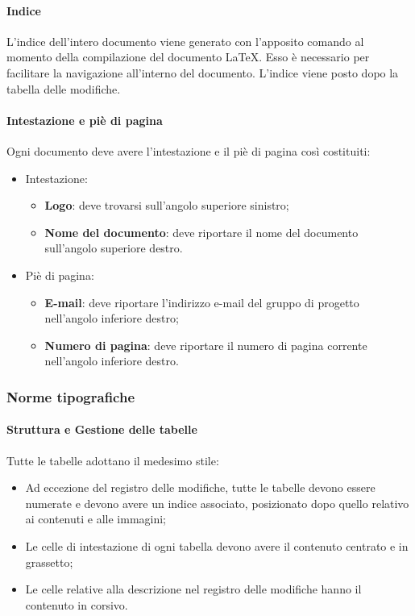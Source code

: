   \paragraph{Indice}
  L'indice dell'intero documento viene generato con l'apposito comando al momento della compilazione
  del documento \LaTeX. Esso è necessario per facilitare la navigazione all'interno del
  documento. L'indice viene posto dopo la tabella delle modifiche.

	  \paragraph{Intestazione e piè di pagina}
	Ogni documento deve avere l'intestazione e il piè di pagina così costituiti:
	\begin{itemize}
		\item Intestazione:
		\begin{itemize}
			\item \textbf{Logo}: deve trovarsi sull'angolo superiore sinistro;
			\item \textbf{Nome del documento}: deve riportare il nome del documento sull'angolo superiore destro.
		\end{itemize}
		\item Piè di pagina:
		\begin{itemize}
			\item \textbf{E-mail}: deve riportare l'indirizzo e-mail del gruppo di progetto
			nell'angolo inferiore destro;
			\item \textbf{Numero di pagina}: deve riportare il numero di pagina corrente
			nell'angolo inferiore destro.
		\end{itemize}
	\end{itemize}
	

  \subsubsection{Norme tipografiche}

  \paragraph{Struttura e Gestione delle tabelle}
  Tutte le tabelle adottano il medesimo stile:
  \begin{itemize}
  	\item Ad eccezione del registro delle modifiche, tutte le tabelle devono essere numerate e devono avere un indice associato, posizionato dopo quello relativo ai contenuti e alle immagini;
  	\item Le celle di intestazione di ogni tabella devono avere il contenuto centrato e in grassetto;
  	\item Le celle relative alla descrizione nel registro delle modifiche hanno il contenuto in corsivo.
  \end{itemize}


